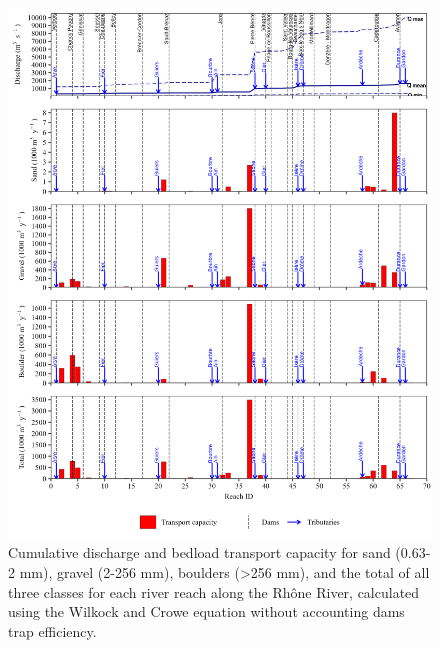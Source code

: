 \documentclass[
]{book}
\begin{document}
\begin{figure}
\includegraphics[width=26.24in]{img/res_cascade/res_E0_eW&C_noDams/plots_tr_cap-silt/tr_cap_res_sum_hy_E0_eW&C_noDams} \caption{Cumulative discharge and bedload transport capacity for sand (0.63-2 mm), gravel (2-256 mm), boulders (>256 mm), and the total of all three classes for each river reach along the Rhône River, calculated using the Wilkock and Crowe equation without accounting dams trap efficiency.}\label{fig:TrcE0eW}
\end{figure}
\end{document}
